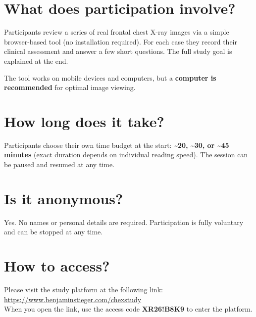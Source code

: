 \documentclass[10pt,a4paper]{article}
\begin{document}
\section{What does participation involve?}

Participants review a series of real frontal chest X-ray images via a simple browser-based tool (no installation required). For each case they record their clinical assessment and answer a few short questions. The full study goal is explained at the end. 

The tool works on mobile devices and computers, but a \textbf{computer is recommended} for optimal image viewing.

\section{How long does it take?}

Participants choose their own time budget at the start: \textbf{\textasciitilde20, \textasciitilde30, or \textasciitilde45 minutes} (exact duration depends on individual reading speed). The session can be paused and resumed at any time.

\section{Is it anonymous?}

Yes. No names or personal details are required. Participation is fully voluntary and can be stopped at any time.

\section{How to access?}

Please visit the study platform at the following link:\\[0.25em]
\url{https://www.benjaminstieger.com/chexstudy}\\[0.25em]
When you open the link, use the access code \textbf{XR26!B8K9} to enter the platform.

\vfill

\noindent{}
\end{document}
